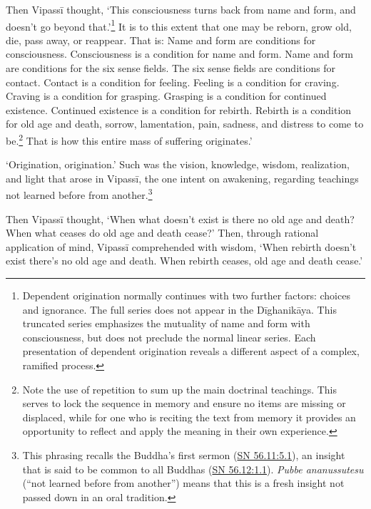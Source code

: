 \documentclass[12pt,openany]{book}%
\begin{document}
Then \textsanskrit{Vipassī} thought, ‘This consciousness turns back from name and form, and doesn’t go beyond that.’\footnote{Dependent origination normally continues with two further factors: choices and ignorance. The full series does not appear in the \textsanskrit{Dīghanikāya}. This truncated series emphasizes the mutuality of name and form with consciousness, but does not preclude the normal linear series. Each presentation of dependent origination reveals a different aspect of a complex, ramified process. } It is to this extent that one may be reborn, grow old, die, pass away, or reappear. That is: Name and form are conditions for consciousness. Consciousness is a condition for name and form. Name and form are conditions for the six sense fields. The six sense fields are conditions for contact. Contact is a condition for feeling. Feeling is a condition for craving. Craving is a condition for grasping. Grasping is a condition for continued existence. Continued existence is a condition for rebirth. Rebirth is a condition for old age and death, sorrow, lamentation, pain, sadness, and distress to come to be.\footnote{Note the use of repetition to sum up the main doctrinal teachings. This serves to lock the sequence in memory and ensure no items are missing or displaced, while for one who is reciting the text from memory it provides an opportunity to reflect and apply the meaning in their own experience. } That is how this entire mass of suffering originates.’ 

‘Origination, origination.’ Such was the vision, knowledge, wisdom, realization, and light that arose in \textsanskrit{Vipassī}, the one intent on awakening, regarding teachings not learned before from another.\footnote{This phrasing recalls the Buddha’s first sermon (\href{https://suttacentral.net/sn56.11/en/sujato\#5.1}{SN 56.11:5.1}), an insight that is said to be common to all Buddhas (\href{https://suttacentral.net/sn56.12/en/sujato\#1.1}{SN 56.12:1.1}). \textit{Pubbe ananussutesu} (“not learned before from another”) means that this is a fresh insight not passed down in an oral tradition. } 

Then \textsanskrit{Vipassī} thought, ‘When what doesn’t exist is there no old age and death? When what ceases do old age and death cease?’ Then, through rational application of mind, \textsanskrit{Vipassī} comprehended with wisdom, ‘When rebirth doesn’t exist there’s no old age and death. When rebirth ceases, old age and death cease.’ 
\end{document}
